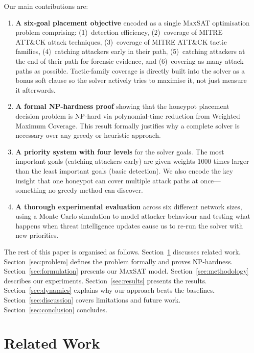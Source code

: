 \documentclass[journal]{IEEEtran}
\newcommand{\maxsat}{\textsc{MaxSAT}}
\begin{document}
Our main contributions are:
\begin{enumerate}
\item \textbf{A six-goal placement objective} encoded as a
single \maxsat{} optimisation problem comprising:
(1)~detection efficiency,
(2)~coverage of MITRE ATT\&CK attack techniques,
(3)~coverage of MITRE ATT\&CK tactic families,
(4)~catching attackers early in their path,
(5)~catching attackers at the end of their path for forensic
evidence, and
(6)~covering as many attack paths as possible.
Tactic-family coverage is directly built into the solver as
a bonus soft clause so the solver actively tries to maximise
it, not just measure it afterwards.

\item \textbf{A formal NP-hardness proof} showing that the
honeypot placement decision problem is NP-hard via
polynomial-time reduction from Weighted Maximum Coverage.
This result formally justifies why a complete solver is
necessary over any greedy or heuristic approach.

\item \textbf{A priority system with four levels} for the
solver goals.
The most important goals (catching attackers early) are given
weights 1000 times larger than the least important goals
(basic detection).
We also encode the key insight that one honeypot can cover
multiple attack paths at once---something no greedy method
can discover.

\item \textbf{A thorough experimental evaluation} across six
different network sizes, using a Monte Carlo simulation to
model attacker behaviour and testing what happens when threat
intelligence updates cause us to re-run the solver with new
priorities.
\end{enumerate}

The rest of this paper is organised as follows.
Section~\ref{sec:related} discusses related work.
Section~\ref{sec:problem} defines the problem formally and
proves NP-hardness.
Section~\ref{sec:formulation} presents our \maxsat{} model.
Section~\ref{sec:methodology} describes our experiments.
Section~\ref{sec:results} presents the results.
Section~\ref{sec:dynamics} explains why our approach beats
the baselines.
Section~\ref{sec:discussion} covers limitations and future
work.
Section~\ref{sec:conclusion} concludes.

\section{Related Work}
\label{sec:related}
\end{document}
